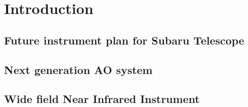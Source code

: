 \chapter{Introduction
\label{chap:introduction}}

\section{Future instrument plan for Subaru Telescope}
\section{Next generation AO system}
\section{Wide field Near Infrared Instrument}


